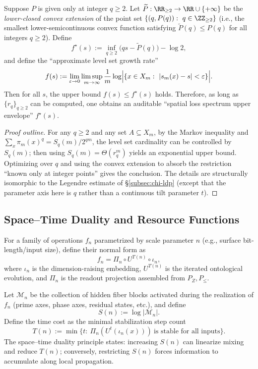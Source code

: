\begin{proposition}\label{prop:pom-fold-multifractal-envelope}
Suppose $P$ is given only at integer $q\ge 2$. Let $\widetilde P:\RR_{\ge 2}\to\RR\cup\{+\infty\}$ be the \emph{lower-closed convex extension} of the point set $\{(q,P(q)):\ q\in\ZZ_{\ge 2}\}$ (i.e., the smallest lower-semicontinuous convex function satisfying $\widetilde P(q)\le P(q)$ for all integers $q\ge2$).
Define
\[
f^\star(s):=\inf_{q\ge 2}\bigl(qs-\widetilde P(q)\bigr)-\log 2,
\]
and define the ``approximate level set growth rate''
\[
f(s):=\lim_{\varepsilon\to 0}\limsup_{m\to\infty}\frac{1}{m}\log\Bigl|\{x\in X_m:\ |s_m(x)-s|<\varepsilon\}\Bigr|.
\]
Then for all $s$, the upper bound $f(s)\le f^\star(s)$ holds. Therefore, as long as $\{r_q\}_{q\ge 2}$ can be computed, one obtains an auditable ``spatial loss spectrum upper envelope'' $f^\star(s)$.
\end{proposition}
\begin{proof}[Proof outline]
For any $q\ge 2$ and any set $A\subseteq X_m$, by the Markov inequality and
\(
\sum_x \pi_m(x)^q=S_q(m)/2^{qm}
\),
the level set cardinality can be controlled by $S_q(m)$; then using $S_q(m)=\Theta(r_q^m)$ yields an exponential upper bound. Optimizing over $q$ and using the convex extension to absorb the restriction ``known only at integer points'' gives the conclusion. The details are structurally isomorphic to the Legendre estimate of \S\ref{subsec:chi-ldp} (except that the parameter axis here is $q$ rather than a continuous tilt parameter $t$).
\end{proof}

\subsection{Space--Time Duality and Resource Functions}\label{subsec:pom-resources}
\begin{definition}\label{def:pom-normal-form}
For a family of operations $f_n$ parametrized by scale parameter $n$ (e.g., surface bit-length/input size), define their normal form as
\[
f_n=\Pi_n\circ U^{T(n)}\circ \iota_n,
\]
where $\iota_n$ is the dimension-raising embedding, $U^{T(n)}$ is the iterated ontological evolution, and $\Pi_n$ is the readout projection assembled from $P_Z,P_{\le}$.
\end{definition}

\begin{definition}\label{def:pom-space-time}
Let $\mathcal M_n$ be the collection of hidden fiber blocks activated during the realization of $f_n$ (prime axes, phase axes, residual states, etc.), and define
\[
S(n):=\log|\mathcal M_n|.
\]
Define the time cost as the minimal stabilization step count
\[
T(n):=\min\{t:\ \Pi_n(U^t(\iota_n(x)))\ \text{is stable for all inputs}\}.
\]
The space--time duality principle states: increasing $S(n)$ can linearize mixing and reduce $T(n)$; conversely, restricting $S(n)$ forces information to accumulate along local propagation.
\end{definition}

